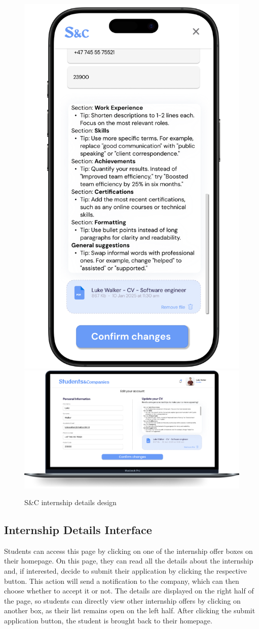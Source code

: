 \begin{figure}[H]
    \centering
    \includegraphics[width=0.2\linewidth]{Images/Mock-up/EditProfileMobile.png}
    \includegraphics[width=0.75\linewidth]{Images/Mock-up/EditProfilePC.png}
    \caption{S\&C internship details design}
    \label{fig:homepage-design}
\end{figure}

\subsection{Internship Details Interface}
Students can access this page by clicking on one of the internship offer boxes on their homepage. On this page, they can read all the details about the internship and, if interested, decide to submit their application by clicking the respective button. This action will send a notification to the company, which can then choose whether to accept it or not. The details are displayed on the right half of the page, so students can directly view other internship offers by clicking on another box, as their list remains open on the left half. After clicking the submit application button, the student is brought back to their homepage. \\

